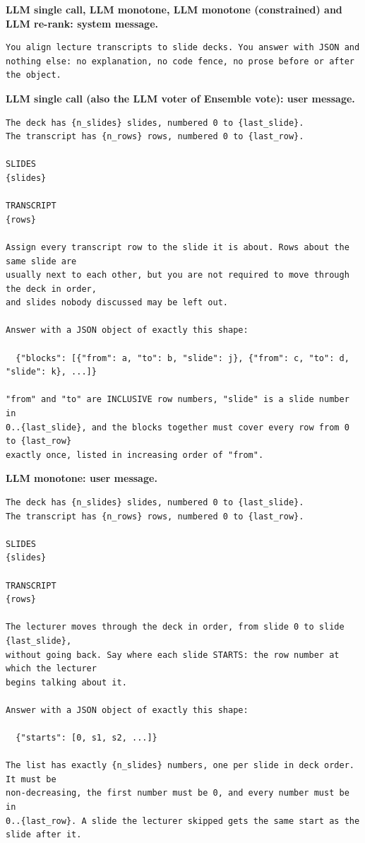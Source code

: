 \par\medskip\noindent\textbf{LLM single call, LLM monotone, LLM monotone (constrained) and LLM re-rank: system message.}\par\nobreak
\begin{lstlisting}
You align lecture transcripts to slide decks. You answer with JSON and nothing else: no explanation, no code fence, no prose before or after the object.
\end{lstlisting}

\par\medskip\noindent\textbf{LLM single call (also the LLM voter of Ensemble vote): user message.}\par\nobreak
\begin{lstlisting}
The deck has {n_slides} slides, numbered 0 to {last_slide}.
The transcript has {n_rows} rows, numbered 0 to {last_row}.

SLIDES
{slides}

TRANSCRIPT
{rows}

Assign every transcript row to the slide it is about. Rows about the same slide are
usually next to each other, but you are not required to move through the deck in order,
and slides nobody discussed may be left out.

Answer with a JSON object of exactly this shape:

  {"blocks": [{"from": a, "to": b, "slide": j}, {"from": c, "to": d, "slide": k}, ...]}

"from" and "to" are INCLUSIVE row numbers, "slide" is a slide number in
0..{last_slide}, and the blocks together must cover every row from 0 to {last_row}
exactly once, listed in increasing order of "from".
\end{lstlisting}

\par\medskip\noindent\textbf{LLM monotone: user message.}\par\nobreak
\begin{lstlisting}
The deck has {n_slides} slides, numbered 0 to {last_slide}.
The transcript has {n_rows} rows, numbered 0 to {last_row}.

SLIDES
{slides}

TRANSCRIPT
{rows}

The lecturer moves through the deck in order, from slide 0 to slide {last_slide},
without going back. Say where each slide STARTS: the row number at which the lecturer
begins talking about it.

Answer with a JSON object of exactly this shape:

  {"starts": [0, s1, s2, ...]}

The list has exactly {n_slides} numbers, one per slide in deck order. It must be
non-decreasing, the first number must be 0, and every number must be in
0..{last_row}. A slide the lecturer skipped gets the same start as the slide after it.
\end{lstlisting}

